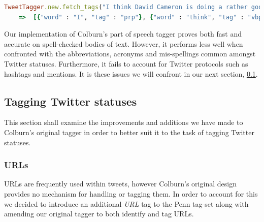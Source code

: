 \begin{lstlisting}[language=Ruby, numbers=none, caption={Returned part of speech tags for \emph{Example 1}}, label=overview:example_1_pos_json]
TweetTagger.new.fetch_tags("I think David Cameron is doing a rather good job: strong leader, holding together seemingly impossible coalition, keeping labour at bay")
	=>	[{"word" : "I", "tag" : "prp"}, {"word" : "think", "tag" : "vbp"}, {"word" : "David", "tag" : "nnp"}, {"word" : "Cameron", "tag" : "nnp"}, {"word" : "is", "tag" : "vbz"}, {"word" : "doing", "tag" : "vbg"}, {"word" : "a", "tag" : "det"}, {"word" : "rather", "tag" : "rb"}, {"word" : "good", "tag" : "jj"}, {"word" : "job", "tag" : "nn"}, {"word" : ":", "tag" : "pps"}, {"word" : "strong", "tag" : "jj"}, {"word" : "leader", "tag" : "nn"}, {"word" : ",", "tag" : "ppc"}, {"word" : "holding", "tag" : "vbg"}, {"word" : "together", "tag" : "rb"}, {"word" : "seemingly", "tag" : "rb"}, {"word" : "impossible", "tag" : "jj"}, {"word" : "coalition", "tag" : "nn"}, {"word" : ",", "tag" : "ppc"}, {"word" : "keeping", "tag" : "vbg"}, {"word" : "labour", "tag" : "nn"}, {"word" : "at", "tag" : "in"}, {"word" : "bay", "tag" : "nn"}]
\end{lstlisting}

Our implementation of Colburn's part of speech tagger proves both fast and accurate on spell-checked bodies of text. However, it performs less well when confronted with the abbreviations, acronyms and mis-spellings common amongst Twitter statuses. Furthermore, it fails to account for Twitter protocols such as hashtags and mentions. It is these issues we will confront in our next section, \ref{subjectivity:statuses}.

\subsection{Tagging Twitter statuses}
\label{subjectivity:statuses}

This section shall examine the improvements and additions we have made to Colburn's original tagger in order to better suit it to the task of tagging Twitter statuses.

\subsubsection{URLs}
\label{subjectivity:urls}

URLs are frequently used within tweets, however Colburn's original design provides no mechanism for handling or tagging them. In order to account for this we decided to introduce an additional \emph{URL} tag to the Penn tag-set along with amending our original tagger to both identify and tag URLs.

